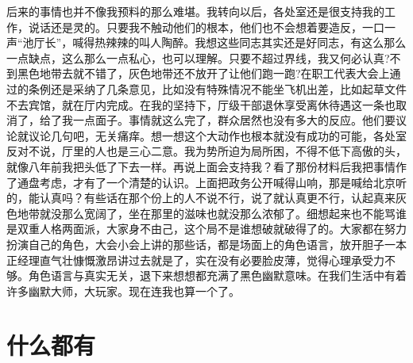 \documentclass[12pt,oneside]{book}
\begin{document}
后来的事情也并不像我预料的那么难堪。我转向以后，各处室还是很支持我的工作，说话还是灵的。只要我不触动他们的根本，他们也不会想着要造反，一口一声``池厅长''，喊得热辣辣的叫人陶醉。我想这些同志其实还是好同志，有这么那么一点缺点，这么那么一点私心，也可以理解。只要不超过界线，我又何必认真?不到黑色地带去就不错了，灰色地带还不放开了让他们跑一跑?在职工代表大会上通过的条例还是采纳了几条意见，比如没有特殊情况不能坐飞机出差，比如起草文件不去宾馆，就在厅内完成。在我的坚持下，厅级干部退休享受离休待遇这一条也取消了，给了我一点面子。事情就这么完了，群众居然也没有多大的反应。他们要议论就议论几句吧，无关痛痒。想一想这个大动作也根本就没有成功的可能，各处室反对不说，厅里的人也是三心二意。我为势所迫为局所困，不得不低下高傲的头，就像八年前我把头低了下去一样。再说上面会支持我？看了那份材料后我把事情作了通盘考虑，才有了一个清楚的认识。上面把政务公开喊得山响，那是喊给北京听的，能认真吗？有些话在那个份上的人不说不行，说了就认真更不行，认起真来灰色地带就没那么宽阔了，坐在那里的滋味也就没那么浓郁了。细想起来也不能骂谁是双重人格两面派，大家身不由己，这个局不是谁想破就破得了的。大家都在努力扮演自己的角色，大会小会上讲的那些话，都是场面上的角色语言，放开胆子一本正经理直气壮慷慨激昂讲过去就是了，实在没有必要脸皮薄，觉得心理承受力不够。角色语言与真实无关，退下来想想都充满了黑色幽默意味。在我们生活中有着许多幽默大师，大玩家。现在连我也算一个了。


\chapter{什么都有}
\end{document}
